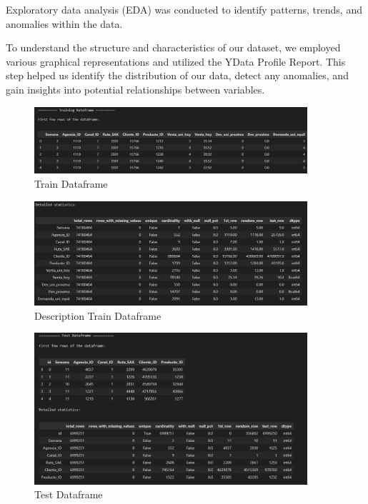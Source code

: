 \documentclass{article}
\begin{document}
Exploratory data analysis (EDA) was conducted to identify patterns, trends, and anomalies within the data. 

To understand the structure and characteristics of our dataset, we employed various graphical representations and utilized the YData Profile Report. This step helped us identify the distribution of our data, detect any anomalies, and gain insights into potential relationships between variables.

\begin{figure}[H]
\begin{center}
\centering
\includegraphics[width=0.9\textwidth]{images/train_df.png}
\caption{Train Dataframe}
\end{center}
\end{figure}

\begin{figure}[H] 
\begin{center}
\centering
\includegraphics[width=0.9\textwidth]{images/descrip_train.png}
\caption{Description Train Dataframe}
\end{center}
\end{figure}

\begin{figure}[H]
\begin{center}
\centering
\includegraphics[width=0.9\textwidth]{images/test_df.png}
\caption{Test Dataframe}
\end{center}
\end{figure}
\end{document}
